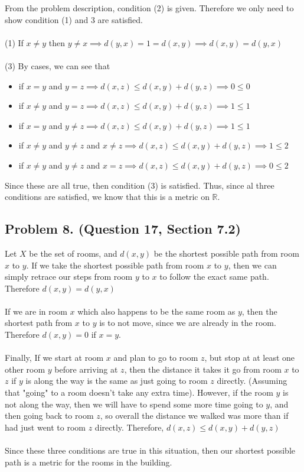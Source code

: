 \documentclass{article}
\begin{document}
From the problem description, condition (2) is given. Therefore we only need to show condition (1) and 3 are satisfied. 
\\\\
(1) If $x\neq y$ then $y\neq x \implies d(y,x) = 1 = d(x,y) \implies d(x,y) = d(y,x)$ \\\\
(3) By cases, we can see that
\begin{itemize}
	\item if $x=y$         and $y=z 		\implies d(x,z) \leq d(x,y) + d(y,z) \implies 0 \leq 0$
	\item if $x\neq y$ and $y=z			\implies d(x,z) \leq d(x,y) + d(y,z) \implies 1 \leq 1$
	\item if $x= y$		   and $y\neq z	\implies d(x,z) \leq d(x,y) + d(y,z) \implies 1 \leq 1$
	\item if $x\neq y$ and $y\neq z$ and $x \neq  z\implies d(x,z) \leq d(x,y) + d(y,z) \implies 1\leq 2$ 
	\item if $x\neq y$ and $y\neq z$ and $x =  z\implies d(x,z) \leq d(x,y) + d(y,z) \implies 0\leq 2$ 
\end{itemize}
Since these are all true, then condition (3) is satisfied. Thus, since al three conditions are satisfied, we know that this is a metric on $\mathbb{R}$.

\subsection*{Problem 8. (Question 17, Section 7.2)}
Let $X$ be the set of rooms, and $d(x,y)$ be the shortest possible path from room $x$ to $y$. If we take the shortest possible path from room $x$ to $y$, then we can simply retrace our steps from room $y$ to $x$ to follow the exact same path. Therefore $d(x,y) = d(y,x)$
\\\\
If we are in room $x$ which also happens to be the same room as $y$, then the shortest path from $x$ to $y$ is to not move, since we are already in the room. Therefore $d(x,y)=0$ if $x=y$.
\\\\
Finally, If we start at room $x$ and plan to go to room $z$, but stop at at least one other room $y$ before arriving at $z$, then the distance it takes it go from room $x$ to $z$ if $y$ is along the way is the same as just going to room $z$ directly. (Assuming that "going" to a room doesn't take any extra time). However, if the room $y$ is not along the way, then we will have to spend some more time going to $y$, and then going back to room $z$, so overall the distance we walked was more than if had just went to room $z$ directly. Therefore, $d(x,z) \leq d(x,y) + d(y,z)$
\\\\
Since these three conditions are true in this situation, then our shortest possible path is a metric for the rooms in the building. 
\end{document}
